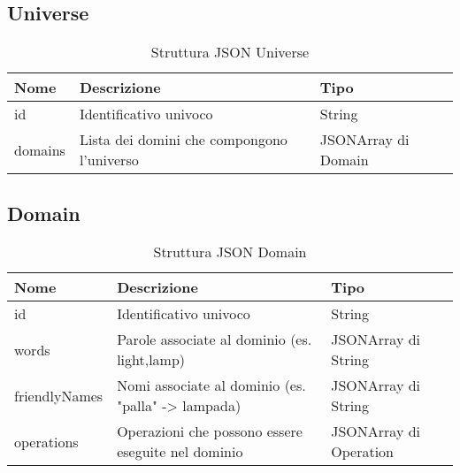 \documentclass[twoside]{supsistudent}
\begin{document}
\subsection{Universe}
\begin{table}[H]
\centering
\caption{Struttura JSON Universe}
\label{Struttura JSON Universe}
\begin{tabular}{@{}|l|l|l|@{}}
\toprule
Nome    & Descrizione                                & Tipo                \\ \midrule
id      & Identificativo univoco                     & String             \\ \midrule
domains & Lista dei domini che compongono l'universo & JSONArray di Domain \\ \bottomrule
\end{tabular}
\end{table}

\subsection{Domain}
\begin{table}[H]
\centering
\caption{Struttura JSON Domain}
\label{Struttura JSON Domain}
\begin{tabular}{@{}|l|l|l|@{}}
\toprule
Nome          & Descrizione                                                                   & Tipo                   \\ \midrule
id            & Identificativo univoco                                                        & String                 \\ \midrule
words         & Parole associate al dominio (es. light,lamp)                         & JSONArray di String    \\ \midrule
friendlyNames & Nomi associate al dominio (es. "palla" -> lampada) & JSONArray di String    \\ \midrule
operations    & Operazioni che possono essere eseguite nel dominio                   & JSONArray di Operation \\ \bottomrule
\end{tabular}
\end{table}
\end{document}
